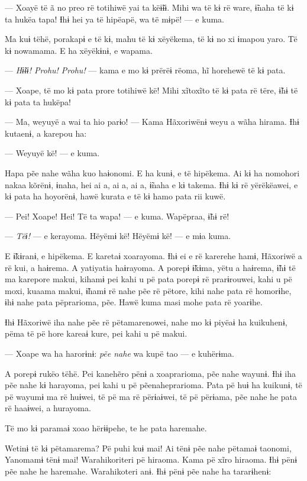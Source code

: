 --- Xoayë të ã no preo rë totihiwë yai ta këɨ̃ɨɨ. Mihi wa të kɨ rë ware,
ɨ̃naha të kɨ ta hukëa tapa! Ɨhɨ hei ya të hipëapë, wa të mɨpë! --- e
kuma. 

Ma kuɨ tëhë, porakapɨ e të kɨ, mahu të kɨ xëyëkema, të kɨ no xi ɨmapou
yaro. Të kɨ nowamama. E ha xëyëkɨnɨ, e wapama. 

--- \textit{Hɨ̃ɨɨ!  Prohu! Prohu!} --- kama e mo kɨ prërëɨ rëoma, hĩ horehewë të kɨ
pata. 

--- Xoape, të mo kɨ pata prore totihiwë kë! Mihi xĩtoxĩto të kɨ pata rë
tëre, ɨ̃hɨ të kɨ pata ta hukëpa!

--- Ma, weyuyë a wai ta hio parɨo! --- Kama Hãxoriwënɨ weyu a wãha hirama.
Ɨhɨ kutaenɨ, a karepou ha:

--- Weyuyë kë! --- e kuma. 

Hapa pẽe nahe wãha kuo haɨonomi. E ha kunɨ, e të hipëkema. Ai kɨ ha
nomohori nakaa kõrënɨ, ɨnaha, hei ai a, ai a, ai a, ɨ̃naha e kɨ takema.
Ɨhɨ kɨ rë yërëkëawei, e kɨ pata ha hoyorënɨ, hawë kurata e të kɨ hamo
pata rii kuwë. 

--- Pei! Xoape! Hei! Të ta wapa! --- e kuma. Wapëpraa, ɨ̃hɨ rë! 

--- \textit{Tëɨ!} --- e kerayoma. Hëyëmɨ kë! Hëyëmɨ kë! --- e mɨa kuma. 

E ɨ̃kɨranɨ, e hipëkema. E karetaɨ xoarayoma. Ɨhɨ ei e rë karerehe hamɨ,
Hãxoriwë a rë kui, a haɨrema. A yatiyatia haɨrayoma. A porepɨ ɨ̃kɨma,
yëtu a haɨrema, ɨ̃hɨ të ma karepore makui, kihamɨ pei kahi u pë pata
porepɨ rë prarɨrouwei, kahi u pë moxi, kuaama makui, ɨ̃hamɨ rë nahe pẽe
rë pëtore, kihi nahe pata rë homorɨhe, ɨhɨ nahe pata pëprarioma, pẽe.
Hawë kuma masi mohe pata rë yoarɨhe. 

Ɨhɨ Hãxoriwë iha nahe pẽe rë pëtamarenowei, nahe mo kɨ piyëaɨ ha
kuikuhenɨ, pëma të pë hore kareaɨ kure, pei kahi u pë makui. 

--- Xoape wa ha harorɨnɨ: \textit{pẽe nahe} wa kupë tao --- e kuhërɨma. 

A porepɨ rukëo tëhë. Pei kanehẽro pënɨ a xoaprarioma, pẽe nahe wayunɨ.
Ɨhɨ iha pẽe nahe kɨ harayoma, pei kahi u pë pẽenaheprarioma. Pata pë huɨ
ha kuikunɨ, të pë wayumɨ ma rë huɨwei, të pë ma rë përɨaɨwei, të pë
përɨama, pẽe nahe he pata rë haaɨwei, a hurayoma. 

Të mo kɨ paramaɨ xoao hërɨɨpehe, te he pata haremahe. 

Wetinɨ të kɨ pëtamarema? Pë puhi kuɨ mai! Ai tënɨ pẽe nahe pëtamaɨ
taonomi, Yanomamɨ tënɨ mai! Warahikoriteri pë hiraoma. Kama pë xĩro
hiraoma. Ɨhɨ pënɨ pẽe nahe he haremahe. Warahikoteri anɨ. Ɨhɨ pënɨ pẽe
nahe ha tararɨhenɨ: 

